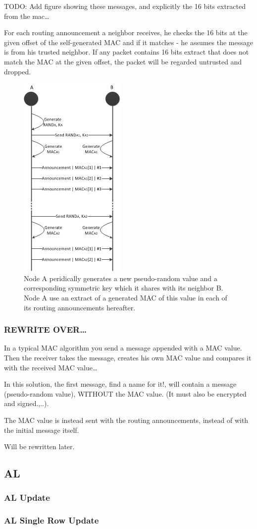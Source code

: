 TODO: Add figure showing these messages, and explicitly the 16 bits extracted
from the mac\ldots

For each routing announcement a neighbor receives, he checks the 16 bits at the
given offset of the self-generated \ac{MAC} and if it matches - he assumes the
message is from his trusted neighbor. If any packet contains 16 bits extract
that does not match the \ac{MAC} at the given offset, the packet will be
regarded untrusted and dropped.

\begin{figure}[h]
	\centering
  	\includegraphics{images/mac_ogm_msc.png}
  	\caption{Node A peridically generates a new pseudo-random value and a
  	corresponding symmetric key which it shares with its neighbor B. Node A use
  	an extract of a generated MAC of this value in each of its routing
  	announcements hereafter.}
	\label{fig:node_states_authorized}
\end{figure}

\subsubsection*{REWRITE OVER\ldots}
In a typical MAC algorithm you send a message appended with a MAC value. Then
the receiver takes the message, creates his own MAC value and compares it with
the received MAC value\ldots 

In this solution, the first message, find a name for it!, will contain a message
(pseudo-random value), WITHOUT the MAC value. (It must also be encrypted and
signed.,..). 

The MAC value is instead sent with the routing announcements, instead of with
the initial message itself.

Will be rewritten later.

\subsection{\acf{AL}}

\subsubsection*{\acf{AL} Update}

\subsubsection*{\acf{AL} Single Row Update}